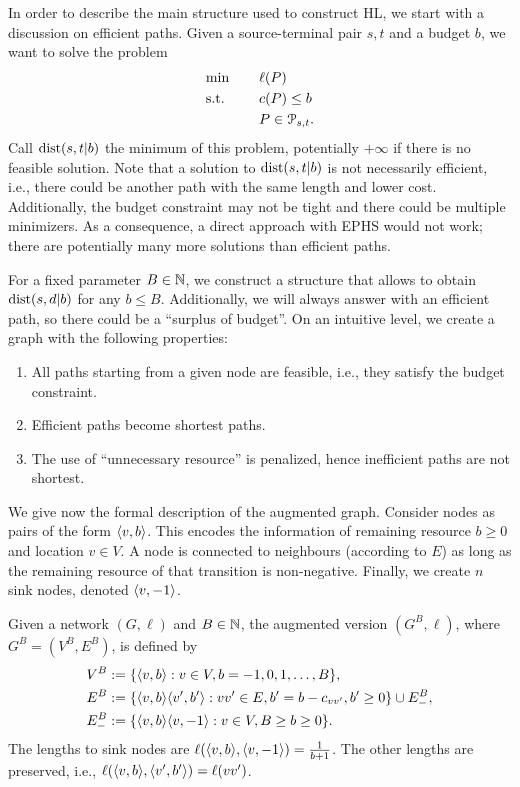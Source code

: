 In order to describe the main structure used to construct HL, we start with a discussion on efficient paths.
Given a source-terminal pair $s,t$ and a budget $b$, we want to solve the problem
\begin{alignat*}{3}
&\text{min}   &&\quad \ell(P) \\
&\text{s.t. } &&\quad  c(P) \leq b\\
& &&\quad P \in \mathcal{P}_{s,t}.
\end{alignat*}
Call $\text{dist}(s,t|b)$ the minimum of this problem, potentially $+\infty$ if there is no feasible solution.
Note that a solution to $\text{dist}(s,t|b)$ is not necessarily efficient, i.e., there could be another path with the same length and lower cost.
Additionally, the budget constraint may not be tight and there could be multiple minimizers. 
As a consequence, a direct approach with EPHS would not work; there are potentially many more solutions than efficient paths.

For a fixed parameter $B\in \mathbb{N}$, we construct a structure that allows to obtain $\text{dist}(s,d|b)$ for any $b\leq B$.
Additionally, we will always answer with an efficient path, so there could be a ``surplus of budget''.
On an intuitive level, we create a graph with the following properties:
\begin{enumerate}
\item All paths starting from a given node are feasible, i.e., they satisfy the budget constraint.
\item Efficient paths become shortest paths.
\item The use of ``unnecessary resource'' is penalized, hence inefficient paths are not shortest.
\end{enumerate}

We give now the formal description of the augmented graph.
Consider nodes as pairs of the form $\langle v,b\rangle$. 
This encodes the information of remaining resource $b\geq 0$ and location $v\in V$.
A node is connected to neighbours (according to $E$) as long as the remaining resource of that transition is non-negative.
Finally, we create $n$ sink nodes, denoted $\langle v,-1\rangle$.

\begin{definition}
Given a network $(G,\ell)$ and $B\in\mathbb{N}$, the augmented version $(G^B,\ell)$, where $G^B=(V^B,E^B)$, is defined by
\begin{align*}
V^B &:=\{\langle v,b\rangle: v\in V, b=-1,0,1,\ldots,B\},\\
E^B &:=\{\langle v,b\rangle\langle v',b'\rangle : vv'\in E, b'=b-c_{vv'}, b'\geq 0\}\cup E^{B}_{-},\\
E^{B}_{-} &:= \{\langle v,b\rangle\langle v,-1\rangle: v\in V, B\geq b\geq 0\}.
\end{align*}
The lengths to sink nodes are $\ell(\langle v,b\rangle,\langle v,-1\rangle)=\frac{1}{b+1}$.
The other lengths are preserved, i.e., $\ell(\langle v,b\rangle,\langle v',b'\rangle)=\ell(vv')$.
\end{definition}

